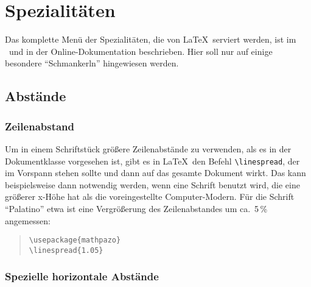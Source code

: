 

\section{Spezialitäten}
 
Das komplette Menü der Spezialitäten, die von \LaTeX\ serviert
werden, ist im \manual\ und in der Online-Dokumentation beschrieben.
Hier soll nur auf einige besondere "`Schmankerln"' hingewiesen
werden.
 
\subsection{Abstände}

\subsubsection{Zeilenabstand}

Um in einem Schriftstück größere Zeilenabstände zu verwenden,
als es in der Dokumentklasse vorgesehen ist, gibt es in
\LaTeX\ den Befehl \lstinline:\linespread:, der im Vorspann stehen sollte
und dann auf das gesamte Dokument wirkt.  Das kann beispielsweise
dann notwendig werden, wenn eine Schrift benutzt wird, die eine größerer x-Höhe 
hat als die voreingestellte Computer-Modern.  Für die Schrift "`Palatino"' etwa
ist eine Vergrößerung des Zeilenabstandes um ca.\ 5\,\% angemessen:

\begin{quote}
\lstinline|\usepackage{mathpazo}|\\
\lstinline|\linespread{1.05}|
\end{quote}

 
 
 
\subsubsection{Spezielle horizontale Abstände}\label{abst:horiz}
 
